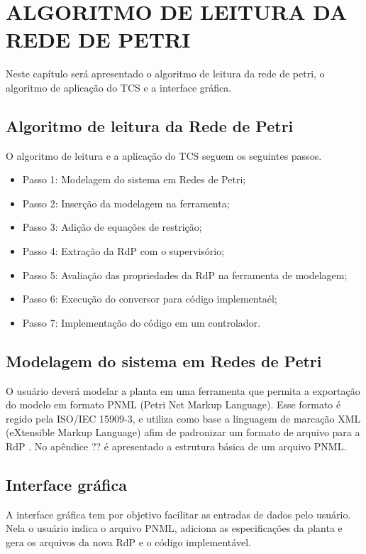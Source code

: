 
\chapter{ALGORITMO DE LEITURA DA REDE DE PETRI}

Neste cap\'itulo ser\'a apresentado o algoritmo de leitura da rede de petri, o algoritmo de aplica\c{c}\~ao do TCS e a interface gr\'afica.

\section{Algoritmo de leitura da Rede de Petri}

O algoritmo de leitura e a aplica\c{c}\~ao do TCS seguem os seguintes passos.
 \begin{itemize}
 	\item Passo 1: Modelagem do sistema em Redes de Petri;
 	\item Passo 2: Inser\c{c}\~ao da modelagem na ferramenta;
 	\item Passo 3: Adi\c{c}\~ao de equa\c{c}\~oes de restri\c{c}\~ao;
 	\item Passo 4: Extra\c{c}\~ao da RdP com o supervis\'orio;
 	\item Passo 5: Avalia\c{c}\~ao das propriedades da RdP na ferramenta de modelagem;
 	\item Passo 6: Execu\c{c}\~ao do conversor para c\'odigo implementa\'el;
 	\item Passo 7: Implementa\c{c}\~ao do c\'odigo em um controlador.
 \end{itemize}


\section{Modelagem do sistema em Redes de Petri}
O usu\'ario dever\'a modelar a planta em uma ferramenta que permita a exporta\c{c}\~ao do modelo em formato PNML (Petri Net Markup Language). Esse formato \'e regido pela ISO/IEC 15909-3, e utiliza como base a linguagem de marca\c{c}\~ao XML (eXtensible Markup Language) afim de padronizar um formato de arquivo para a RdP \cite{pnmlorg}. No ap\^endice ?? \'e apresentado a estrutura b\'asica de um arquivo PNML.

\section{Interface gr\'afica}
A interface gr\'afica tem por objetivo facilitar as entradas de dados pelo usu\'ario. Nela o usu\'ario indica o arquivo PNML, adiciona as especifica\c{c}\~oes da planta e gera os arquivos da nova RdP e o c\'odigo implement\'avel. 

